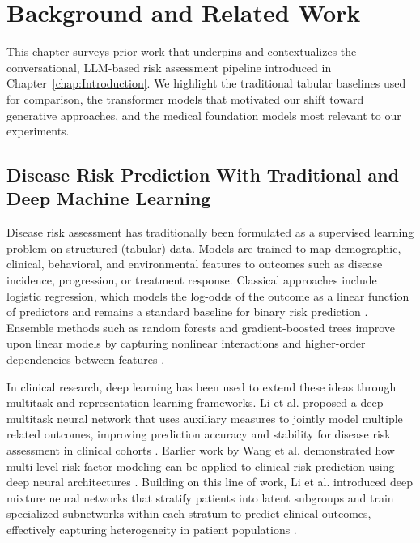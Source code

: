 \section{Background and Related Work}
\label{chap:background}

This chapter surveys prior work that underpins and contextualizes the conversational, LLM-based risk assessment pipeline introduced in Chapter~\ref{chap:Introduction}. We highlight the traditional tabular baselines used for comparison, the transformer models that motivated our shift toward generative approaches, and the medical foundation models most relevant to our experiments.

\subsection{Disease Risk Prediction With Traditional and Deep Machine Learning}

Disease risk assessment has traditionally been formulated as a supervised learning problem on structured (tabular) data. Models are trained to map demographic, clinical, behavioral, and environmental features to outcomes such as disease incidence, progression, or treatment response. Classical approaches include logistic regression, which models the log-odds of the outcome as a linear function of predictors and remains a standard baseline for binary risk prediction \cite{hosmer2013applied}. Ensemble methods such as random forests and gradient-boosted trees improve upon linear models by capturing nonlinear interactions and higher-order dependencies between features \cite{breiman2001random,chen2016xgboost}.

In clinical research, deep learning has been used to extend these ideas through multitask and representation-learning frameworks. Li et al. proposed a deep multitask neural network that uses auxiliary measures to jointly model multiple related outcomes, improving prediction accuracy and stability for disease risk assessment in clinical cohorts \cite{li2018leveraging}. Earlier work by Wang et al. demonstrated how multi-level risk factor modeling can be applied to clinical risk prediction using deep neural architectures \cite{wang2019prioritization}. Building on this line of work, Li et al. introduced deep mixture neural networks that stratify patients into latent subgroups and train specialized subnetworks within each stratum to predict clinical outcomes, effectively capturing heterogeneity in patient populations \cite{li2020predicting}.

